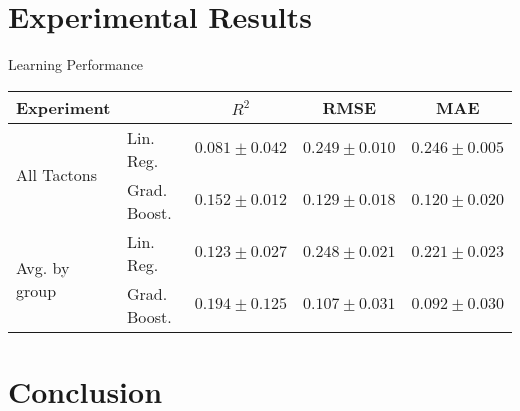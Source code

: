 \documentclass[table]{beamer}
\begin{document}
\section{Experimental Results}


























\begin{frame}{Learning Performance}

\begin{table}[htb]
\centering

\begin{tabular}[t]{llccc}
\toprule
 Experiment & & $R^2$ & RMSE & MAE  \\
 \midrule
 \multirow{2}{*}{All Tactons} & Lin. Reg.    & $0.081 \pm 0.042$ & $0.249 \pm 0.010$ & $0.246 \pm 0.005$ \\
 & Grad. Boost.                              & $0.152 \pm 0.012$ & $0.129 \pm 0.018$ & $0.120 \pm 0.020$ \\
 \midrule
 \multirow{2}{*}{Avg. by group} & Lin. Reg.  & $0.123 \pm 0.027$ & $0.248 \pm 0.021$ & $0.221 \pm 0.023$ \\
                            & Grad. Boost.   & $0.194 \pm 0.125$ & $0.107 \pm 0.031$ & $0.092 \pm 0.030$ \\
 \bottomrule
\end{tabular}

\label{tab:prediction_results}
\end{table}%
    
\end{frame}


\section{Conclusion}
\end{document}
